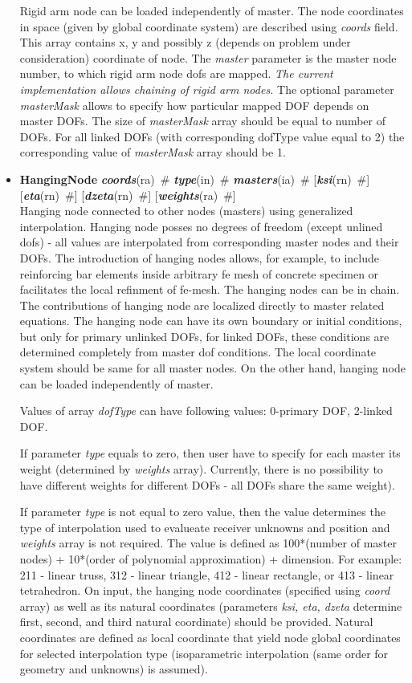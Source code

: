 \documentclass[draft]{article}
\newcommand{\param}[1]{{\em #1}}
\newcommand{\keywordnotype}[1]{\mbox{{\it{\bf{#1}}}}}
\newcommand{\keyword}[2]{\mbox{{\keywordnotype{#1}\tiny (#2)}}}
\newcommand{\entKeywordInst}[1]{\mbox{{\bf{{#1}}}}}
\newcommand{\field}[2]{\mbox{\keyword{#1}{#2}~\#}}
\newcommand{\optField}[2]{\mbox{[\field{#1}{#2}]}}
\begin{document}
\begin{itemize}
Rigid arm node can be loaded
independently of master. The node coordinates in space (given by
global coordinate system) are described using \param{coords}
field. This array contains x, y and possibly z (depends on problem
under consideration) coordinate of node. The \param{master} parameter is the
master node number, to which rigid arm node dofs are mapped.
{\em The current implementation allows chaining of rigid arm nodes.}
The optional parameter \param{masterMask} allows to specify how
particular mapped DOF depends on master DOFs. The size of \param{masterMask} array 
should be equal to number of DOFs. For all linked DOFs (with
corresponding dofType value equal to 2) the corresponding value of
\param{masterMask} array should be 1.

\item
\entKeywordInst{HangingNode}  \field{coords}{ra} \field{type}{in} \field{masters}{ia}
\optField{ksi}{rn}\\
\optField{eta}{rn} \optField{dzeta}{rn} \optField{weights}{ra}\\
Hanging node connected to other nodes (masters) using generalized interpolation.
Hanging node posses no degrees of freedom	(except unlined dofs) - all values are
interpolated from corresponding master nodes and their DOFs.
The introduction of hanging nodes allows, for example, to include reinforcing bar elements inside 
arbitrary fe mesh of concrete specimen or facilitates the local
refinment of fe-mesh. The hanging nodes can be in chain.
The contributions of hanging node are localized directly to master related equations.
The hanging node can have its own boundary or initial conditions, but
only for primary unlinked DOFs, for linked DOFs, these conditions are
determined completely from master dof conditions. 
The local coordinate system should be same for all master nodes.
On the other hand, hanging node can be loaded independently of
master.

Values of array \param{dofType} can have following values: {0-primary
 DOF, 2-linked DOF}.

If parameter \param{type} equals to zero, then user have to specify
for each master its weight (determined by \param{weights} array).
Currently, there is no possibility to have different weights for
different DOFs - all DOFs share the same weight).

If parameter \param{type} is not equal to zero value, then the value determines the type of interpolation used to
evalueate receiver unknowns and position and \param{weights} array is not required. The value is
defined as 100*(number of master nodes) + 10*(order of polynomial
approximation) + dimension. For example: 211 - linear truss, 312 -
linear triangle, 412 - linear rectangle, or 413 - linear tetrahedron.
On input, the hanging node coordinates (specified using
\param{coord} array) as well as its natural coordinates (parameters
\param{ksi, eta, dzeta} determine first, second, and third natural
coordinate) should be provided.  Natural coordinates are
defined as local coordinate that yield node global coordinates for
selected interpolation type (isoparametric interpolation (same order
for geometry and unknowns) is assumed).





\end{itemize}
\end{document}
